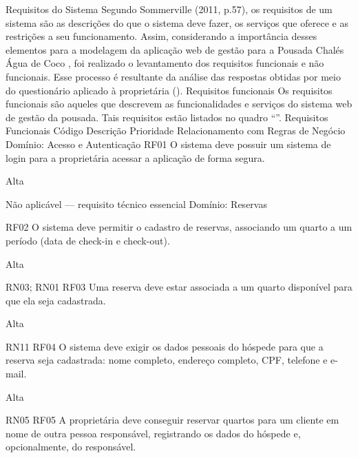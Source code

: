 Requisitos do Sistema
        Segundo Sommerville (2011, p.57), os requisitos de um sistema são as descrições do que o sistema deve fazer, os serviços que oferece e as restrições a seu funcionamento. Assim, considerando a importância desses elementos para a modelagem da aplicação web de gestão para a Pousada Chalés Água de Coco , foi realizado o levantamento dos requisitos funcionais e não funcionais. Esse processo é resultante da análise das respostas obtidas por meio do questionário aplicado à proprietária (). 
Requisitos funcionais
Os requisitos funcionais são aqueles que descrevem as funcionalidades e serviços do sistema web de gestão da pousada. Tais requisitos estão listados no quadro “”.
Requisitos Funcionais
	Código
	Descrição
	Prioridade
	Relacionamento com Regras de Negócio
	Domínio: Acesso e Autenticação
	RF01
	O sistema deve possuir um sistema de login para a proprietária acessar a aplicação de forma segura.
	



Alta
	



Não aplicável — requisito técnico essencial
	Domínio: Reservas
	

	

	RF02
	O sistema deve permitir o cadastro de reservas, associando um quarto a um período (data de check-in e check-out).
	



Alta
	



RN03; RN01
	RF03
	Uma reserva deve estar associada a um quarto disponível para que ela seja cadastrada.


	



Alta
	



RN11
	RF04
	O sistema deve exigir os dados pessoais do hóspede para que a reserva seja cadastrada: nome completo, endereço completo, CPF, telefone e e-mail.


	







Alta
	





RN05 
	RF05
	A proprietária deve conseguir reservar quartos para um cliente em nome de outra pessoa responsável, registrando os dados do hóspede e, opcionalmente, do responsável.
	







